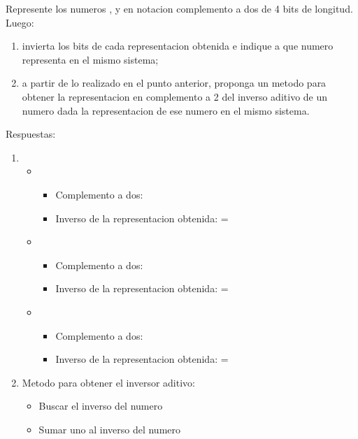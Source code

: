 \begin{enunciado}{\ejercicio}
Represente los numeros ,  y  en notacion complemento a dos de 4 bits de
longitud. Luego:
\begin{enumerate}[label=(\alph*)]
    \item invierta los bits de cada representacion obtenida e indique a que numero representa en
    el mismo sistema;
    \item a partir de lo realizado en el punto anterior, proponga un metodo para obtener la representacion en 
    complemento a 2 del inverso aditivo de un numero dada la representacion de ese numero en el mismo 
    sistema.
\end{enumerate}

Respuestas: 

\begin{enumerate}[label=(\alph*)]
    \item \begin{itemize}
        \item {}
        \begin{itemize}
            \item Complemento a dos:  
            \item Inverso de la representacion obtenida:  =  
        \end{itemize}
        \item {}
        \begin{itemize}
            \item Complemento a dos: 
            \item Inverso de la representacion obtenida:  =  
        \end{itemize}
        \item {}
        \begin{itemize}
            \item Complemento a dos: 
            \item Inverso de la representacion obtenida:  =  
        \end{itemize}
    \end{itemize}
    \item Metodo para obtener el inversor aditivo:
    \begin{itemize}
        \item Buscar el inverso del numero
        \item Sumar uno al inverso del numero
    \end{itemize}
\end{enumerate}
\end{enunciado}
